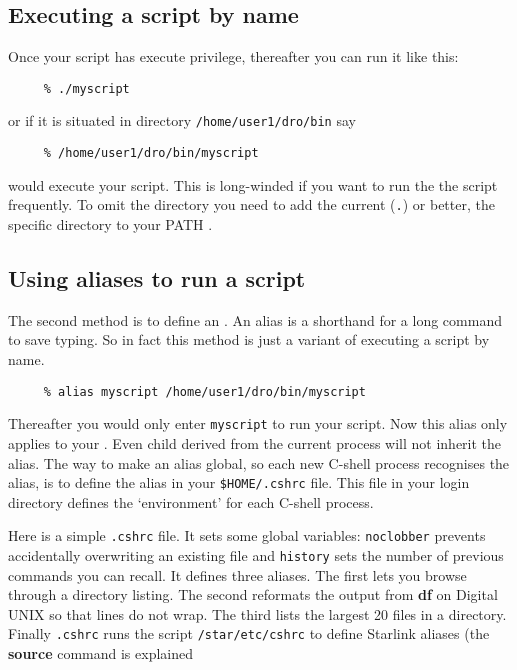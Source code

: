 \subsection{Executing a script by name
\label{sc4_se_by_name}}

Once your script has execute privilege, thereafter you can
run it like this:

\small
\begin{verbatim}
     % ./myscript
\end{verbatim}
\normalsize
or if it is situated in directory {\tt /home/user1/dro/bin} say

\small
\begin{verbatim}
     % /home/user1/dro/bin/myscript
\end{verbatim}
\normalsize
would execute your script.  This is long-winded if you want to run the
the script frequently.  To omit the directory  you need to add the current ({\tt{.}}) or better,
the specific directory to your PATH
.


\subsection{Using aliases to run a script
\label{sc4_se_aliases}}

The second method is to define an .
An alias is a shorthand for a long command to save typing.
So in fact this method is just a variant of executing a script by name.

\small
\begin{verbatim}
     % alias myscript /home/user1/dro/bin/myscript
\end{verbatim}
\normalsize
Thereafter you would only enter {\tt myscript} to run your script. Now
this alias only applies to your . Even child 
derived from the current process will not inherit the alias.  The way
to make an alias global, so each new C-shell process recognises the
alias, is to define the alias in your {\tt \$HOME/.cshrc} file.  This
file in your login directory defines the `environment' for each
C-shell process.

Here is a simple {\tt{.cshrc}} file.  It sets some global variables:
{\tt noclobber} prevents accidentally overwriting an existing file and
{\tt history} sets the number of previous commands you can recall.  It
defines three aliases.  The first lets you browse through a
directory listing.  The second reformats the output from {\bf df}
on Digital UNIX so that lines do not wrap.  The third lists the largest
20 files in a directory.  Finally {\tt .cshrc} runs the script
{\tt /star/etc/cshrc} to define Starlink aliases (the {\bf source}
command is explained 

